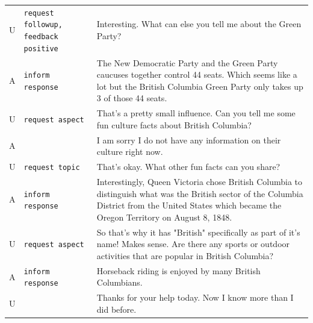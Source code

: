 \begin{table}[t]
\begin{center}
\begin{tabular}{p{0.2cm}p{3.8cm}p{11cm}}
            U & \texttt{request followup, feedback positive} & Interesting. What can else you tell me about the Green Party?                                                                                                                                        \\
            A & \texttt{inform response}                     & The New Democratic Party and the Green Party caucuses together control 44 seats. Which seems like a lot but the British Columbia Green Party only takes up 3 of those 44 seats.                      \\
            U & \texttt{request aspect}                      & That's a pretty small influence. Can you tell me some fun culture facts about British Columbia?                                                                                                      \\
            A & \texttt{}                                    & I am sorry I do not have any information on their culture right now.                                                                                                                                 \\
            U & \texttt{request topic}                       & That's okay. What other fun facts can you share?                                                                                                                                                     \\
            A & \texttt{inform response}                     & Interestingly, Queen Victoria chose British Columbia to distinguish what was the British sector of the Columbia District from the United States which became the Oregon Territory on August 8, 1848. \\
            U & \texttt{request aspect}                      & So that's why it has "British" specifically as part of it's name! Makes sense. Are there any sports or outdoor activities that are popular in British Columbia?                                      \\
            A & \texttt{inform response}                     & Horseback riding is enjoyed by many British Columbians.                                                                                                                                              \\
            U & \texttt{}                                    & Thanks for your help today. Now I know more than I did before.                                                                                                                                       \\

\end{tabular}
\end{center}
\end{table}
